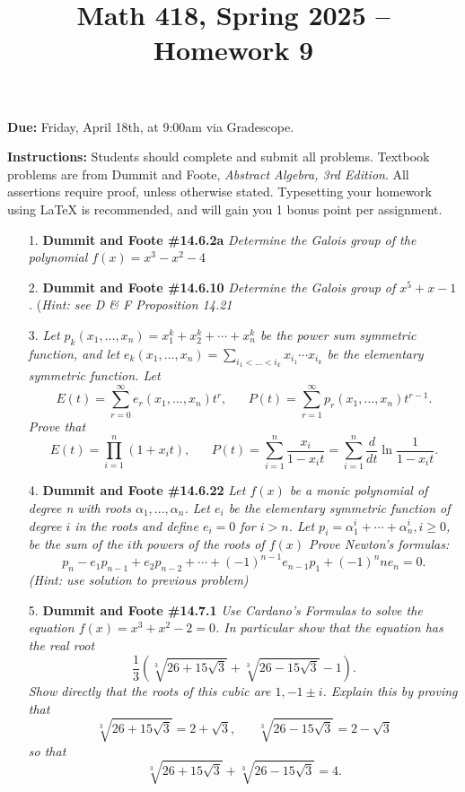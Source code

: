 \documentclass[12pt]{article}
\title{Math 418, Spring 2025 -- Homework 9}
\date{}
\begin{document}
 \maketitle
\vspace{-80pt}

\textbf{Due:} Friday, April 18th, at 9:00am via Gradescope.

\textbf{Instructions:} Students should complete and submit all problems. Textbook problems are from Dummit and Foote, \emph{Abstract Algebra, 3rd Edition}. All assertions require proof, unless otherwise stated. Typesetting your homework using LaTeX is recommended, and will gain you 1 bonus point per assignment.

\begin{enumerate}

\item[1.] \textbf{Dummit and Foote \#14.6.2a} \textit{Determine the Galois group of the polynomial $f(x) = x^3 - x^2 - 4$}

\item[2.] \textbf{Dummit and Foote \#14.6.10} \textit{Determine the Galois group of $x^5 + x - 1$.} (\emph{Hint: see D \& F Proposition 14.21}

\item[3.] \textit{Let $p_k(x_1,\ldots,x_n) = x_1^k + x_2^k + \cdots + x_n^k$ be the \emph{power sum symmetric function}, and let $e_k(x_1,\ldots,x_n) = \sum_{i_1<\ldots < i_k} x_{i_1}\cdots x_{i_k}$ be the elementary symmetric function. Let \[E(t) = \sum_{r=0}^\infty e_r(x_1,\ldots,x_n) t^r, \hspace{20pt} P(t) = \sum_{r=1}^\infty p_r(x_1,\ldots,x_n) t^{r-1}.\] Prove that \[E(t) = \prod_{i=1}^n (1+x_it), \hspace{20pt} P(t) = \sum_{i=1}^n \frac{x_i}{1-x_it} = \sum_{i=1}^n \frac{d}{dt} \ln\frac{1}{1-x_it}.\]}

\item[4.] \textbf{Dummit and Foote \#14.6.22} \textit{Let $f(x)$ be a monic polynomial of degree n with roots $\alpha_1,\ldots,\alpha_n$. Let $e_i$ be the elementary symmetric function of degree $i$ in the roots and define $e_i = 0$ for $i > n$. Let $p_i = \alpha_1^i + \cdots + \alpha_n^i, i\ge 0$, be the sum of the $i$th powers of the roots of $f(x)$ Prove Newton's formulas: \[p_n - e_1p_{n-1} + e_2p_{n-2} + \cdots + (-1)^{n-1}e_{n-1}p_1 + (-1)^n n e_n = 0.\]} \emph{(Hint: use solution to previous problem)}

\item[5.] \textbf{Dummit and Foote \#14.7.1} \textit{Use Cardano's Formulas to solve the equation $f(x) = x^3 + x^2 - 2 = 0$. In particular show that the equation has the real root \[\frac{1}{3}\left(\sqrt[3]{26 + 15\sqrt{3}} + \sqrt[3]{26 - 15\sqrt{3}} - 1\right).\] Show directly that the roots of this cubic are $1 , -1\pm i$. Explain this by proving that \[\sqrt[3]{26 + 15\sqrt{3}} = 2+\sqrt{3}, \hspace{20pt} \sqrt[3]{26 - 15\sqrt{3}} = 2-\sqrt{3}\] so that \[\sqrt[3]{26 + 15\sqrt{3}} + \sqrt[3]{26 - 15\sqrt{3}} = 4.\]}


\end{enumerate}
\end{document}
